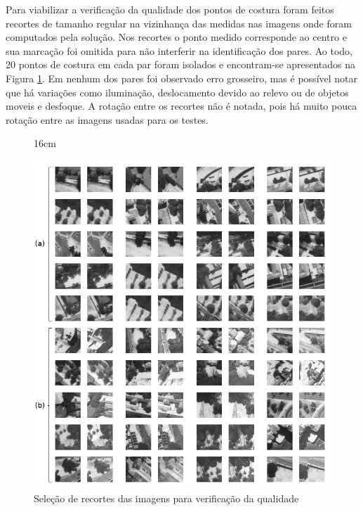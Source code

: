 Para viabilizar a verificação da qualidade dos pontos de costura foram feitos recortes de tamanho regular na vizinhança das medidas nas imagens onde foram computados pela solução. Nos recortes o ponto medido corresponde ao centro e sua marcação foi omitida para não interferir na identificação dos pares. Ao todo, 20 pontos de costura em cada par foram isolados e encontram-se apresentados na Figura \ref{quality}. Em nenhum dos pares foi observado erro grosseiro, mas é possível notar que há variações como iluminação, deslocamento devido ao relevo ou de objetos moveis e desfoque. A rotação entre os recortes não é notada, pois há muito pouca rotação entre as imagens usadas para os testes.  

\begin{figure}[]{16cm}
  \caption{Seleção de recortes das imagens para verificação da qualidade} \label{quality}
    \includegraphics[width=1\hsize]{figuras/quality.png}
\end{figure}

